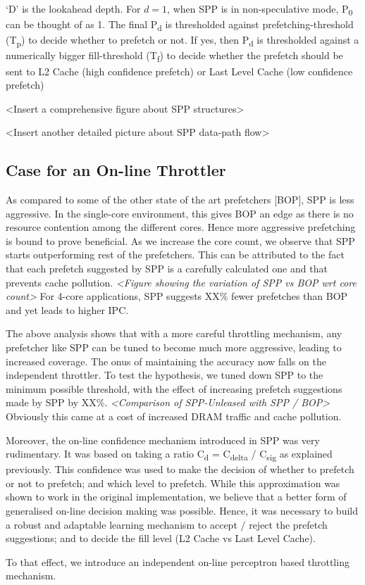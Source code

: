 `D' is the lookahead depth. For $d = 1$, when SPP is in
non-speculative mode, P\textsubscript{0} can be thought of as 1. 
The final P\textsubscript{d} is thresholded against prefetching-threshold
(T\textsubscript{p}) to decide whether to prefetch or not.  If yes,
then P\textsubscript{d} is thresholded against a numerically bigger
fill-threshold (T\textsubscript{f}) to decide whether the prefetch
should be sent to L2 Cache (high confidence prefetch) or Last Level
Cache (low confidence prefetch)

<Insert a comprehensive figure about SPP structures>

<Insert another detailed picture about SPP data-path flow>

\subsection{Case for an On-line Throttler}
\label{Background-Case}
As compared to some of the other state of the art prefetchers [BOP], SPP is
less aggressive.  In the single-core environment, this gives BOP an edge as
there is no resource contention among the different cores.  Hence more
aggressive prefetching is bound to prove beneficial.  As we increase the core
count, we observe that SPP starts outperforming rest of the prefetchers.  This
can be attributed to the fact that each prefetch suggested by SPP is a
carefully calculated one and that prevents cache pollution.  \textit{<Figure
showing the variation of SPP vs BOP wrt core count>} For 4-core applications,
SPP suggests XX\% fewer prefetches than BOP and yet leads to higher IPC.

The above analysis shows that with a more careful throttling mechanism, any
prefetcher like SPP can be tuned to become much more aggressive, leading to
increased coverage.  The onus of maintaining the accuracy now falls on the
independent throttler.  To test the hypothesis, we tuned down SPP to the
minimum possible threshold, with the effect of increasing prefetch suggestions
made by SPP by XX\%.  \textit{<Comparison of SPP-Unleased with SPP / BOP>}
Obviously this came at a cost of increased DRAM traffic and cache pollution.

Moreover, the on-line confidence mechanism introduced in SPP was very
rudimentary.  It was based on taking a ratio C\textsubscript{d} =
C\textsubscript{delta} / C\textsubscript{sig} as explained previously. This
confidence was used to make the decision of whether to prefetch or not to
prefetch; and which level to prefetch.  While this approximation was shown to
work in the original implementation, we believe that a better form of
generalised on-line decision making was possible.  Hence, it was necessary to
build a robust and adaptable learning mechanism to accept / reject the
prefetch suggestions; and to decide the fill level (L2 Cache vs Last Level
Cache).

To that effect, we introduce an independent on-line perceptron based
throttling mechanism.
